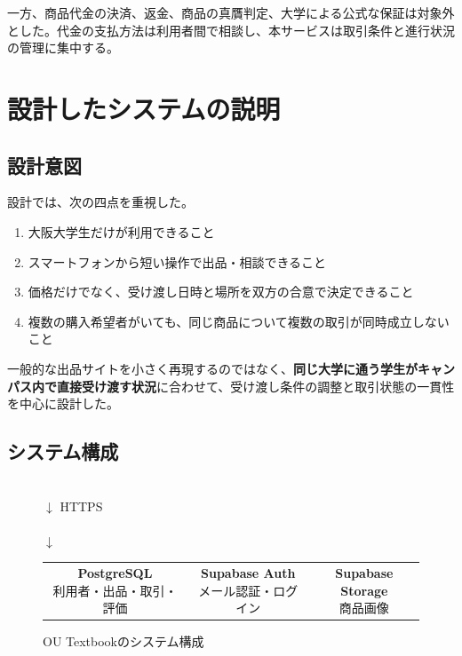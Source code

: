 \documentclass[11pt,a4paper]{article}
\newcommand{\oustrong}[1]{\textbf{\color{darknavy}#1}}
\begin{document}
一方、商品代金の決済、返金、商品の真贋判定、大学による公式な保証は対象外とした。代金の支払方法は利用者間で相談し、本サービスは取引条件と進行状況の管理に集中する。

\section{設計したシステムの説明}

\subsection{設計意図}

設計では、次の四点を重視した。

\begin{enumerate}
  \item 大阪大学生だけが利用できること
  \item スマートフォンから短い操作で出品・相談できること
  \item 価格だけでなく、受け渡し日時と場所を双方の合意で決定できること
  \item 複数の購入希望者がいても、同じ商品について複数の取引が同時成立しないこと
\end{enumerate}

一般的な出品サイトを小さく再現するのではなく、\oustrong{同じ大学に通う学生がキャンパス内で直接受け渡す状況}に合わせて、受け渡し条件の調整と取引状態の一貫性を中心に設計した。

\subsection{システム構成}

\begin{figure}[H]
  \centering
  \\[3mm]
  {\Large$\downarrow$ HTTPS}\\[3mm]
  \\[3mm]
  {\Large$\downarrow$}\\[2mm]
  \begin{tabular}{ccc}
    \fbox{\parbox{0.25\textwidth}{\centering
      \textbf{PostgreSQL}\\
      利用者・出品・取引・評価
    }} &
    \fbox{\parbox{0.25\textwidth}{\centering
      \textbf{Supabase Auth}\\
      メール認証・ログイン
    }} &
    \fbox{\parbox{0.25\textwidth}{\centering
      \textbf{Supabase Storage}\\
      商品画像
    }}
  \end{tabular}
  \caption{OU Textbookのシステム構成}
\end{figure}
\end{document}
